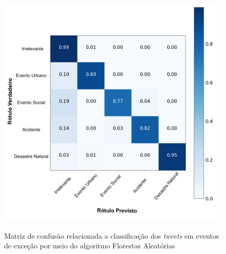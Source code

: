 \documentclass[
	12pt,				%
	oneside,			%
	a4paper,			%
	english,			%
	brazil				%
	]{abntex2ppgsi}
\begin{document}
{{\begin{apendicesenv}
\begin{figure}[!htb]
	\centering
 	  \caption{Matriz de confusão relacionada a classificação dos \textit{tweets} em eventos de exceção por meio do algoritmo Florestas Aleatórias}
		\includegraphics[width=1\linewidth]{images/confusion_matrix_rf_pt.png}
	\label{fig:confusion_matrix_rf}
\end{figure}


\end{apendicesenv}}}
\end{document}
